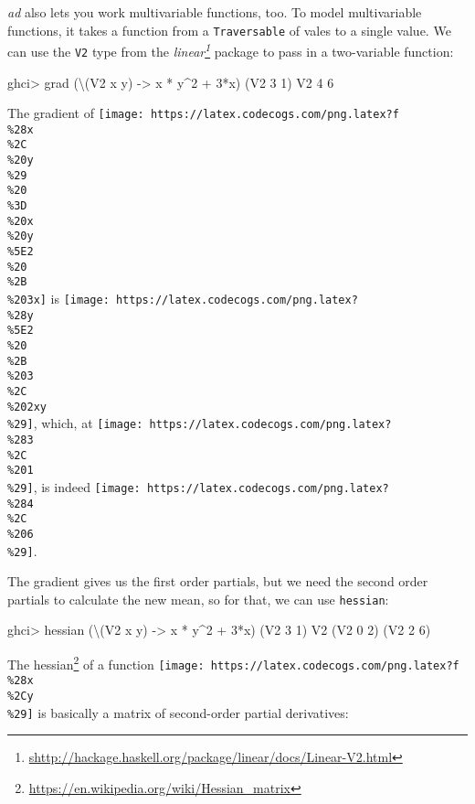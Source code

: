 \documentclass[]{article}
\newenvironment{Shaded}{}{}
\newcommand{\DataTypeTok}[1]{\textcolor[rgb]{0.56,0.13,0.00}{#1}}
\newcommand{\DecValTok}[1]{\textcolor[rgb]{0.25,0.63,0.44}{#1}}
\newcommand{\NormalTok}[1]{#1}
\newcommand{\OperatorTok}[1]{\textcolor[rgb]{0.40,0.40,0.40}{#1}}
\newcommand{\OtherTok}[1]{\textcolor[rgb]{0.00,0.44,0.13}{#1}}
\renewcommand{\href}[2]{#2\footnote{\url{#1}}}
\begin{document}
\emph{ad} also lets you work multivariable functions, too. To model
multivariable functions, it takes a function from a \texttt{Traversable} of
vales to a single value. We can use the \texttt{V2} type from the
\emph{\href{shttp://hackage.haskell.org/package/linear/docs/Linear-V2.html}{linear}}
package to pass in a two-variable function:

\begin{Shaded}
\begin{Highlighting}[]
\NormalTok{ghci}\OperatorTok{>}\NormalTok{ grad (\textbackslash{}(}\DataTypeTok{V2}\NormalTok{ x y) }\OtherTok{{-}>}\NormalTok{ x }\OperatorTok{*}\NormalTok{ y}\OperatorTok{\^{}}\DecValTok{2} \OperatorTok{+} \DecValTok{3}\OperatorTok{*}\NormalTok{x) (}\DataTypeTok{V2} \DecValTok{3} \DecValTok{1}\NormalTok{)}
\DataTypeTok{V2} \DecValTok{4} \DecValTok{6}
\end{Highlighting}
\end{Shaded}

The gradient of
\texttt{[image: https://latex.codecogs.com/png.latex?f\\\%28x\\\%2C\\\%20y\\\%29\\\%20\\\%3D\\\%20x\\\%20y\\\%5E2\\\%20\\\%2B\\\%203x]}
is
\texttt{[image: https://latex.codecogs.com/png.latex?\\\%28y\\\%5E2\\\%20\\\%2B\\\%203\\\%2C\\\%202xy\\\%29]},
which, at
\texttt{[image: https://latex.codecogs.com/png.latex?\\\%283\\\%2C\\\%201\\\%29]}, is
indeed
\texttt{[image: https://latex.codecogs.com/png.latex?\\\%284\\\%2C\\\%206\\\%29]}.

The gradient gives us the first order partials, but we need the second order
partials to calculate the new mean, so for that, we can use \texttt{hessian}:

\begin{Shaded}
\begin{Highlighting}[]
\NormalTok{ghci}\OperatorTok{>}\NormalTok{ hessian (\textbackslash{}(}\DataTypeTok{V2}\NormalTok{ x y) }\OtherTok{{-}>}\NormalTok{ x }\OperatorTok{*}\NormalTok{ y}\OperatorTok{\^{}}\DecValTok{2} \OperatorTok{+} \DecValTok{3}\OperatorTok{*}\NormalTok{x) (}\DataTypeTok{V2} \DecValTok{3} \DecValTok{1}\NormalTok{)}
\DataTypeTok{V2}\NormalTok{ (}\DataTypeTok{V2} \DecValTok{0} \DecValTok{2}\NormalTok{)}
\NormalTok{   (}\DataTypeTok{V2} \DecValTok{2} \DecValTok{6}\NormalTok{)}
\end{Highlighting}
\end{Shaded}

The \href{https://en.wikipedia.org/wiki/Hessian_matrix}{hessian} of a function
\texttt{[image: https://latex.codecogs.com/png.latex?f\\\%28x\\\%2Cy\\\%29]} is
basically a matrix of second-order partial derivatives:
\end{document}
